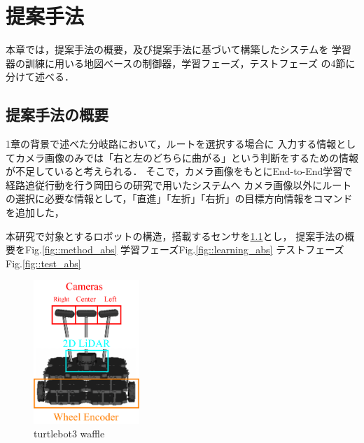 \chapter{提案手法}\label{chap:method}
本章では，提案手法の概要，及び提案手法に基づいて構築したシステムを
学習器の訓練に用いる地図べースの制御器，学習フェーズ，テストフェーズ
の4節に分けて述べる．

\section{提案手法の概要}

1章の背景で述べた分岐路において，ルートを選択する場合に
入力する情報としてカメラ画像のみでは「右と左のどちらに曲がる」という判断をするための情報が不足していると考えられる．
そこで，カメラ画像をもとにEnd-to-End学習で経路追従行動を行う岡田らの研究\cite{okada}で用いたシステムへ
カメラ画像以外にルートの選択に必要な情報として，「直進」「左折」「右折」の目標方向情報をコマンドを追加した，

本研究で対象とするロボットの構造，搭載するセンサを\ref{fig::turtlebot3_gazo}とし，
提案手法の概要をFig.\ref{fig::method_abs}
学習フェーズFig.\ref{fig::learning_abs}
テストフェーズFig.\ref{fig::test_abs}



\begin{figure}[H]
    \centering
    \includegraphics[width = 4cm]{./figs/turtlebot3_kame.pdf}
    \caption{turtlebot3 waffle}
    \label{fig::turtlebot3_gazo}
\end{figure}



